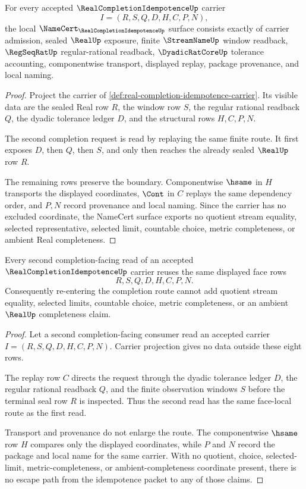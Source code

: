 \begin{theorem}
\label{thm:real-completion-idempotence-namecert-obligations}
For every accepted $\RealCompletionIdempotenceUp$ carrier
$$
I=(R,S,Q,D,H,C,P,N),
$$
the local $\NameCert_{\RealCompletionIdempotenceUp}$ surface consists exactly of carrier admission, sealed $\RealUp$ exposure, finite $\StreamNameUp$ window readback, $\RegSeqRatUp$ regular-rational readback, $\DyadicRatCoreUp$ tolerance accounting, componentwise transport, displayed replay, package provenance, and local naming.
\end{theorem}
\begin{proof}
Project the carrier of \autoref{def:real-completion-idempotence-carrier}. Its visible data are the sealed Real row $R$, the window row $S$, the regular rational readback $Q$, the dyadic tolerance ledger $D$, and the structural rows $H,C,P,N$.

The second completion request is read by replaying the same finite route. It first exposes $D$, then $Q$, then $S$, and only then reaches the already sealed $\RealUp$ row $R$.

The remaining rows preserve the boundary. Componentwise $\hsame$ in $H$ transports the displayed coordinates, $\Cont$ in $C$ replays the same dependency order, and $P,N$ record provenance and local naming. Since the carrier has no excluded coordinate, the NameCert surface exports no quotient stream equality, selected representative, selected limit, countable choice, metric completeness, or ambient Real completeness.
\end{proof}

\begin{theorem}
\label{thm:real-completion-idempotence-nonescape}
Every second completion-facing read of an accepted $\RealCompletionIdempotenceUp$ carrier reuses the same displayed face rows
$$
R,S,Q,D,H,C,P,N .
$$
Consequently re-entering the completion route cannot add quotient stream equality, selected limits, countable choice, metric completeness, or an ambient $\RealUp$ completeness claim.
\end{theorem}
\begin{proof}
Let a second completion-facing consumer read an accepted carrier $I=(R,S,Q,D,H,C,P,N)$. Carrier projection gives no data outside these eight rows.

The replay row $C$ directs the request through the dyadic tolerance ledger $D$, the regular rational readback $Q$, and the finite observation windows $S$ before the terminal seal row $R$ is inspected. Thus the second read has the same face-local route as the first read.

Transport and provenance do not enlarge the route. The componentwise $\hsame$ row $H$ compares only the displayed coordinates, while $P$ and $N$ record the package and local name for the same carrier. With no quotient, choice, selected-limit, metric-completeness, or ambient-completeness coordinate present, there is no escape path from the idempotence packet to any of those claims.
\end{proof}

